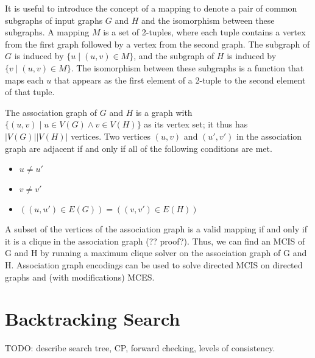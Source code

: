 It is useful to introduce the concept of a mapping to denote a pair of common
subgraphs of input graphs $G$ and $H$ and the isomorphism between these subgraphs.
A mapping $M$ is a set of 2-tuples, where each tuple contains a vertex from the
first graph followed by a vertex from the second graph. The subgraph of $G$ is
induced by $\{u \mid (u, v) \in M\}$, and the subgraph of $H$ is induced by $\{v \mid (u, v)
\in M\}$. The isomorphism between these subgraphs is a function that maps each $u$
that appears as the first element of a 2-tuple to the second element of that
tuple.

The association graph of $G$ and $H$ is a graph with $\{(u,v) \mid u \in V(G) \wedge v \in
V(H)\}$ as its vertex set; it thus has $|V(G)||V(H)|$ vertices. Two vertices $(u,v)$
and $(u',v')$ in the association graph are adjacent if and only if all of the
following conditions are met.

\begin{itemize}
  \item $u \not= u'$
  \item $v \not= v'$
  \item $((u,u') \in E(G)) = ((v,v') \in E(H))$
\end{itemize}

A subset of the vertices of the association graph is a valid mapping if and
only if it is a clique in the association graph (?? proof?). Thus, we can find
an MCIS of G and H by running a maximum clique solver on the association graph
of G and H. Association graph encodings can be used to solve directed MCIS on
directed graphs and (with modifications) MCES.

\section{Backtracking Search}

TODO: describe search tree, CP, forward checking, levels of consistency.

